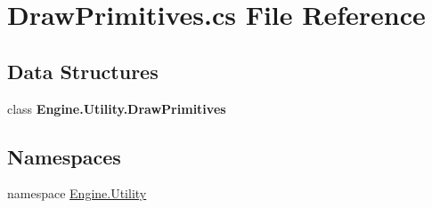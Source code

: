 \hypertarget{a00224}{}\section{Draw\+Primitives.\+cs File Reference}
\label{a00224}
\subsection*{Data Structures}
\begin{DoxyCompactItemize}
\item 
class {\bfseries Engine.\+Utility.\+Draw\+Primitives}
\end{DoxyCompactItemize}
\subsection*{Namespaces}
\begin{DoxyCompactItemize}
\item 
namespace \hyperlink{a00282}{Engine.\+Utility}
\end{DoxyCompactItemize}
